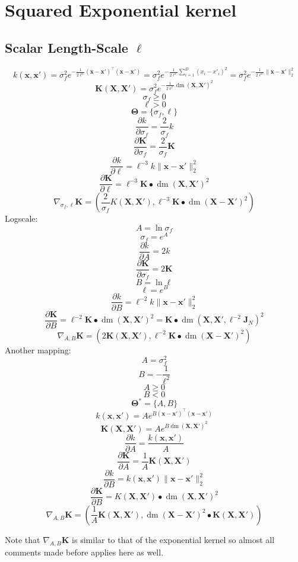 \documentclass[a4paper,11pt]{article}
\newcommand\x{{\mathbf x}}
\newcommand\X{{\mathbf X}}
\newcommand\K{{\mathbf K}}
\newcommand\J{{\mathbf J}}
\DeclareMathOperator*{\dm}{dm}
\begin{document}
\section{Squared Exponential kernel}

\subsection{Scalar Length-Scale $\ell$}
$$k(\x,\x') = \sigma_f^2 e^{-\frac{1}{2\ell^2} (\x-\x')^{\top}(\x-\x')}
  = \sigma_f^2 e^{-\frac{1}{2\ell^2} \sum_{i=1}^D (x_i - x'_i)^2} =
  \sigma_f^2 e^{-\frac{1}{2\ell^2} \|\x-\x'\|_2^2}$$ 
$$\K(\X,\X') = \sigma_f^2 e^{-\frac{1}{2\ell^2} \dm(\X,\X')^2}$$
$$\sigma_f \ge 0$$
$$\ell > 0$$
$$\mathbf{\Theta} = \{ \sigma_f, \ell \}$$
$$\frac{\partial k}{\partial \sigma_f} = \frac{2}{\sigma_f}k$$
$$\frac{\partial \K}{\partial \sigma_f} = \frac{2}{\sigma_f}\K$$
$$\frac{\partial k}{\partial \ell} = \ell^{-3} k \|\x-\x'\|_2^2 $$
$$\frac{\partial \K}{\partial \ell} = \ell^{-3} \K \bullet \dm(\X,\X')^2$$
$$\nabla_{\sigma_f,\ell} \K = \left(\frac{2}{\sigma_f}K(\X,\X'), \ell^{-3} \K \bullet \dm(\X-\X')^2 \right)$$
Logscale:
$$A = \ln{\sigma_f}$$
$$\sigma_f = e^A$$
$$\frac{\partial k}{\partial A} = 2k$$
$$\frac{\partial \K}{\partial \sigma_f} = 2\K$$
$$B = \ln{\ell}$$
$$\ell = e^B$$
$$\frac{\partial k}{\partial B} = \ell^{-2} k \|\x-\x'\|_2^2$$
$$\frac{\partial \K}{\partial B} = \ell^{-2} \K \bullet \dm(\X,\X')^2 = \K \bullet \dm(\X,\X',\ell^{-2}\J_N)^2$$
$$\nabla_{A,B} \K = \left( 2\K(\X,\X'), \ell^{-2} \K \bullet \dm(\X-\X')^2 \right)$$
Another mapping:
$$A = \sigma_f^2$$
$$B = -\frac{1}{\ell^2}$$
$$A \ge 0$$
$$B < 0$$
$$\mathbf{\Theta}^* = \{ A, B\}$$
$$k(\x,\x') = A e^{B (\x-\x')^{\top}(\x-\x')}$$
$$\K(\X,\X') = A e^{B \dm(\X,\X')^2}$$
$$\frac{\partial k}{\partial A} = \frac{k(\x,\x')}{A}$$
$$\frac{\partial \K}{\partial A} = \frac{1}{A}\K(\X,\X')$$
$$\frac{\partial k}{\partial B} = k(\x,\x') \|\x-\x'\|_2^2$$
$$\frac{\partial \K}{\partial B} = K(\X,\X') \bullet \dm(\X,\X')^2$$
$$\nabla_{A,B} \K = (\frac{1}{A} \K(\X,\X'), \dm(\X-\X')^2 \bullet
\K(\X,\X'))$$

Note that $\nabla_{A,B} \K$ is similar to that of the exponential
kernel so almost all comments made before applies here as well.
\end{document}
